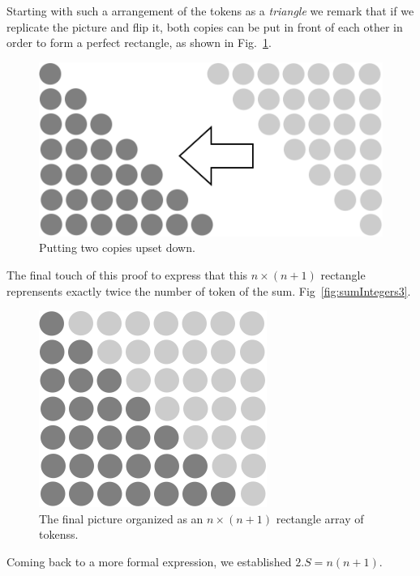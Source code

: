 Starting with such a arrangement of the tokens as a \textit{triangle}
we remark that if we replicate the picture and flip it, both copies can be put in front of each other
in order to form a perfect rectangle, as shown in Fig.~\ref{fig:sumIntegers2}.
\begin{figure}[ht]
\begin{center}
       \includegraphics[scale=0.4]{FiguresMaths/SumIntegersIntermediate}
              \caption{Putting two copies upset down.}
       \label{fig:sumIntegers2}
\end{center}
\end{figure}

The final touch of this proof to express that this $n \times (n+1)$ rectangle 
reprensents exactly twice the number of token of the sum.
Fig~\ref{fig:sumIntegers3}.
\begin{figure}[ht]
\begin{center}
       \includegraphics[scale=0.4]{FiguresMaths/SumIntegersFinal}
\caption{The final picture organized as an $n \times (n+1)$ rectangle
  array of tokenss.}
       \label{fig:sumIntegerss3}
\end{center}
\end{figure}
Coming back to a more formal expression, we established 
$2.S = n(n+1)$.


